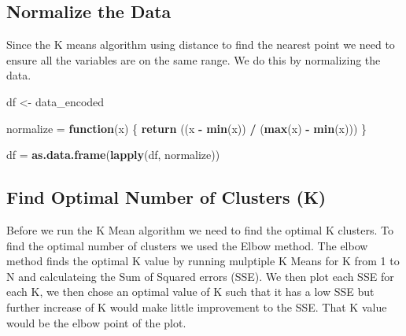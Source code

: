 \documentclass[]{article}
\newenvironment{Shaded}{\begin{snugshade}}{\end{snugshade}}
\newcommand{\KeywordTok}[1]{\textcolor[rgb]{0.13,0.29,0.53}{\textbf{#1}}}
\newcommand{\StringTok}[1]{\textcolor[rgb]{0.31,0.60,0.02}{#1}}
\newcommand{\ControlFlowTok}[1]{\textcolor[rgb]{0.13,0.29,0.53}{\textbf{#1}}}
\newcommand{\OperatorTok}[1]{\textcolor[rgb]{0.81,0.36,0.00}{\textbf{#1}}}
\newcommand{\NormalTok}[1]{#1}
\begin{document}
\subsection{Normalize the Data}\label{normalize-the-data}

Since the K means algorithm using distance to find the nearest point we
need to ensure all the variables are on the same range. We do this by
normalizing the data.

\begin{Shaded}
\begin{Highlighting}[]
\NormalTok{df <-}\StringTok{ }\NormalTok{data_encoded}

\NormalTok{normalize =}\StringTok{ }\ControlFlowTok{function}\NormalTok{(x) \{}
  \KeywordTok{return}\NormalTok{ ((x }\OperatorTok{-}\StringTok{ }\KeywordTok{min}\NormalTok{(x)) }\OperatorTok{/}\StringTok{ }\NormalTok{(}\KeywordTok{max}\NormalTok{(x) }\OperatorTok{-}\StringTok{ }\KeywordTok{min}\NormalTok{(x)))}
\NormalTok{\}}

\NormalTok{df =}\StringTok{ }\KeywordTok{as.data.frame}\NormalTok{(}\KeywordTok{lapply}\NormalTok{(df, normalize))}
\end{Highlighting}
\end{Shaded}

\subsection{Find Optimal Number of Clusters
(K)}\label{find-optimal-number-of-clusters-k}

Before we run the K Mean algorithm we need to find the optimal K
clusters. To find the optimal number of clusters we used the Elbow
method. The elbow method finds the optimal K value by running mulptiple
K Means for K from 1 to N and calculateing the Sum of Squared errors
(SSE). We then plot each SSE for each K, we then chose an optimal value
of K such that it has a low SSE but further increase of K would make
little improvement to the SSE. That K value would be the elbow point of
the plot.
\end{document}
